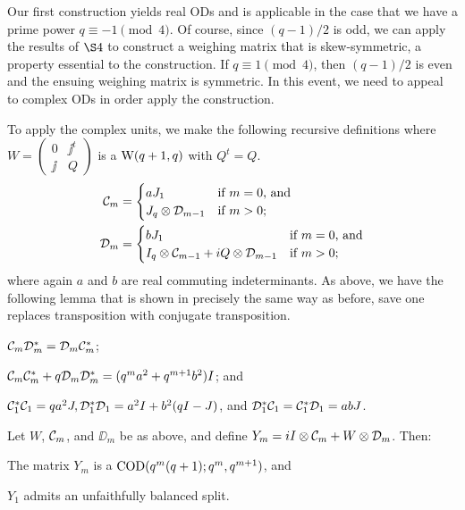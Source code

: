 \documentclass[../../../main]{subfiles}
\begin{document}
Our first construction yields real ODs and is applicable in the case that we have a prime power $q \equiv -1 \pmod{4}$. Of course, since $(q-1)/2$ is odd, we can apply the results of $\S4$ to construct a weighing matrix that is skew-symmetric, a property essential to the construction. If $q \equiv 1 \pmod{4}$, then $(q-1)/2$ is even and the ensuing weighing matrix is symmetric. In this event, we need to appeal to complex ODs in order apply the construction.

To apply the complex units, we make the following recursive definitions where $W=\left(\begin{smallmatrix} 0 & \jj^t \\ \jj & Q \end{smallmatrix}\right)$ is a $\text{W}(q+1,q)$ with $Q^t=Q$.
\begin{align*}
 \mathcal{C}_m&=\begin{cases}
        aJ_1 & \text{if $m=0$, and} \\
        J_q \otimes \mathcal{D}_{m-1} & \text{if $m>0$;}
       \end{cases}\\
 \mathcal{D}_m&=\begin{cases}
        bJ_1 & \text{if $m=0$, and} \\
        I_q \otimes \mathcal{C}_{m-1} + iQ \otimes \mathcal{D}_{m-1} & \text{if $m>0$;}
       \end{cases}
\end{align*}
where again $a$ and $b$ are real commuting indeterminants. As above, we have the following lemma that is shown in precisely the same way as before, save one replaces transposition with conjugate transposition.

\begin{lem}
  \begin{defenum}
  \item[]
  \item $\mathcal{C}_m\mathcal{D}_m^* = \mathcal{D}_m\mathcal{C}_m^*$;
  \item $\mathcal{C}_m\mathcal{C}_m^* + q\mathcal{D}_m\mathcal{D}_m^* = (q^ma^2+q^{m+1}b^2)I$; and
  \item $\mathcal{C}_1^*\mathcal{C}_1 = qa^2J, \mathcal{D}_1^*\mathcal{D}_1=a^2I+b^2(qI-J)$, and $\mathcal{D}_1^*\mathcal{C}_1=\mathcal{C}_1^*\mathcal{D}_1=abJ$.
 \end{defenum}
\end{lem}

\begin{thm}
 Let $W$, $\mathcal{C}_m$, and $\DD_m$ be as above, and define $Y_m=iI \otimes \mathcal{C}_m + W \otimes \mathcal{D}_m$. Then:
 \begin{defenum}
  \item The matrix $Y_m$ is a $\text{COD}(q^m(q+1); q^m, q^{m+1})$, and
  \item $Y_1$ admits an unfaithfully balanced split.
 \end{defenum}
\end{thm}
\end{document}
